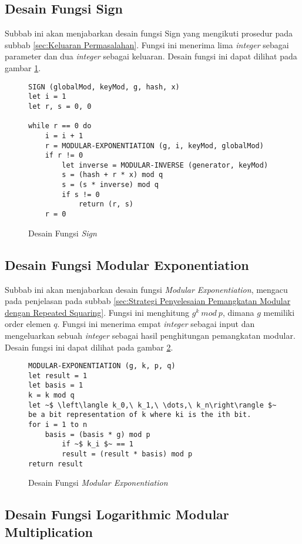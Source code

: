 \subsection{Desain Fungsi Sign}

Subbab ini akan menjabarkan desain fungsi Sign yang mengikuti prosedur pada subbab \ref{sec:Keluaran Permasalahan}. Fungsi ini menerima lima \textit{integer} sebagai parameter dan dua \textit{integer} sebagai keluaran. Desain fungsi ini dapat dilihat pada gambar \ref{psdo:sign}.
\begin{figure}[h!]
\begin{lstlisting}[firstnumber=0]
SIGN (globalMod, keyMod, g, hash, x)
let i = 1
let r, s = 0, 0

while r == 0 do
	i = i + 1
	r = MODULAR-EXPONENTIATION (g, i, keyMod, globalMod)
	if r != 0
		let inverse = MODULAR-INVERSE (generator, keyMod)
		s = (hash + r * x) mod q
		s = (s * inverse) mod q
		if s != 0
			return (r, s)
	r = 0
\end{lstlisting}
\caption{Desain Fungsi \textit{Sign}}
\label{psdo:sign}
\end{figure}

\subsection{Desain Fungsi Modular Exponentiation}

Subbab ini akan menjabarkan desain fungsi \textit{Modular Exponentiation}, mengacu pada penjelasan pada subbab \ref{sec:Strategi Penyelesaian Pemangkatan Modular dengan Repeated Squaring}. Fungsi ini menghitung $ g^k\ mod\ p $, dimana $ g $ memiliki order elemen $ q $. Fungsi ini menerima empat \textit{integer} sebagai input dan mengeluarkan sebuah \textit{integer} sebagai hasil penghitungan pemangkatan modular. Desain fungsi ini dapat dilihat pada gambar \ref{psdo:modex}.
\begin{figure}[h!]
\begin{lstlisting}[firstnumber=0]
MODULAR-EXPONENTIATION (g, k, p, q)
let result = 1
let basis = 1
k = k mod q
let ~$ \left\langle k_0,\ k_1,\ \dots,\ k_n\right\rangle $~ be a bit representation of k where ki is the ith bit.
for i = 1 to n
	basis = (basis * g) mod p
		if ~$ k_i $~ == 1
		result = (result * basis) mod p
return result
\end{lstlisting}
\caption{Desain Fungsi \textit{Modular Exponentiation}}
\label{psdo:modex}
\end{figure}

\subsection{Desain Fungsi Logarithmic Modular Multiplication}

